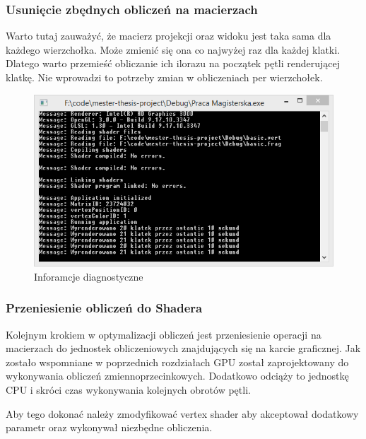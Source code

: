 \subsubsection{Usunięcie zbędnych obliczeń na macierzach}
\thispagestyle{empty}
\par\indent

Warto tutaj zauważyć, że macierz projekcji oraz widoku jest taka sama dla każdego wierzchołka. Może zmienić się ona co najwyżej raz dla każdej klatki. Dlatego warto przemieść obliczanie ich ilorazu na początek pętli renderującej klatkę. Nie wprowadzi to potrzeby zmian w obliczeniach per wierzchołek.



\begin{figure}[h]
	\includegraphics[width=\textwidth]{images/optimized1_console}
	\caption{Inforamcje diagnostyczne}
\end{figure}


\subsubsection{Przeniesienie obliczeń do Shadera}
\thispagestyle{empty}
\par\indent

Kolejnym krokiem w optymalizacji obliczeń jest przeniesienie operacji na macierzach do jednostek obliczeniowych znajdujących się na  karcie graficznej. Jak zostało wspomniane w poprzednich rozdziałach GPU został zaprojektowany do wykonywania obliczeń zmiennoprzecinkowych. Dodatkowo odciąży to jednostkę CPU i skróci czas wykonywania kolejnych obrotów pętli.

Aby tego dokonać należy zmodyfikować vertex shader aby akceptował dodatkowy parametr oraz wykonywał niezbędne obliczenia.

